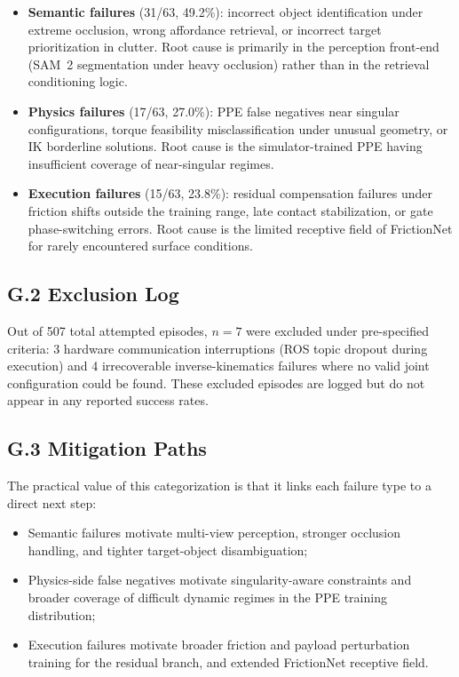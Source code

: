\documentclass[11pt]{article}
\begin{document}
\begin{itemize}[leftmargin=1.5em]
\item \textbf{Semantic failures} (31/63, 49.2\%): incorrect object identification under extreme occlusion, wrong affordance retrieval, or incorrect target prioritization in clutter. Root cause is primarily in the perception front-end (SAM~2 segmentation under heavy occlusion) rather than in the retrieval conditioning logic.
\item \textbf{Physics failures} (17/63, 27.0\%): PPE false negatives near singular configurations, torque feasibility misclassification under unusual geometry, or IK borderline solutions. Root cause is the simulator-trained PPE having insufficient coverage of near-singular regimes.
\item \textbf{Execution failures} (15/63, 23.8\%): residual compensation failures under friction shifts outside the training range, late contact stabilization, or gate phase-switching errors. Root cause is the limited receptive field of FrictionNet for rarely encountered surface conditions.
\end{itemize}

\subsection{G.2 Exclusion Log}

Out of 507 total attempted episodes, $n=7$ were excluded under pre-specified criteria: 3 hardware communication interruptions (ROS topic dropout during execution) and 4 irrecoverable inverse-kinematics failures where no valid joint configuration could be found. These excluded episodes are logged but do not appear in any reported success rates.

\subsection{G.3 Mitigation Paths}

The practical value of this categorization is that it links each failure type to a direct next step:

\begin{itemize}[leftmargin=1.5em]
\item Semantic failures motivate multi-view perception, stronger occlusion handling, and tighter target-object disambiguation;
\item Physics-side false negatives motivate singularity-aware constraints and broader coverage of difficult dynamic regimes in the PPE training distribution;
\item Execution failures motivate broader friction and payload perturbation training for the residual branch, and extended FrictionNet receptive field.
\end{itemize}
\end{document}
